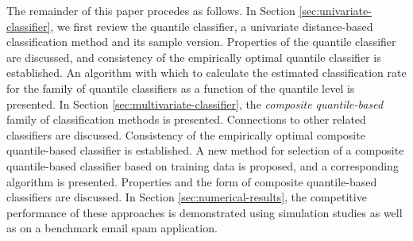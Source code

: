 The remainder of this paper procedes as follows.  In Section
\ref{sec:univariate-classifier}, we first review the quantile classifier, a
univariate distance-based classification method and its sample version.
Properties of the quantile classifier are discussed, and consistency of the
empirically optimal quantile classifier is established.  An algorithm with which
to calculate the estimated classification rate for the family of quantile
classifiers as a function of the quantile level is presented.  In Section
\ref{sec:multivariate-classifier}, the \emph{composite quantile-based} family of
classification methods is presented.  Connections to other related classifiers
are discussed.  Consistency of the empirically optimal composite quantile-based
classifier is established.  A new method for selection of a composite
quantile-based classifier based on training data is proposed, and a
corresponding algorithm is presented.  Properties and the form of composite
quantile-based classifiers are discussed.  In Section
\ref{sec:numerical-results}, the competitive performance of these approaches is
demonstrated using simulation studies as well as on a benchmark email spam
application.





